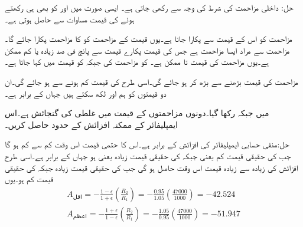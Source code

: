 حل:
داخلی مزاحمت  کی شرط کی وجہ سے  رکھی جاتی ہے۔ ایسی صورت میں  اور  کو بھی  ہی رکھتے ہوئے  کی قیمت مساوات   سے حاصل ہوتی ہے۔  

مزاحمت کو اس کے قیمت سے پکارا جاتا ہے۔یوں  قیمت کے مزاحمت کو  کا مزاحمت پکارا جائے گا۔ مزاحمت سے مراد ایسا مزاحمت ہے جس کی قیمت پکارے قیمت سے  پانچ فی صد زیادہ یا کم ممکن ہے۔یوں 
 مزاحمت کی قیمت  تا  ممکن ہے۔ کو مزاحمت کی  جبکہ   کو قیمت میں  کہا جاتا ہے۔

مزاحمت  کی قیمت  بڑھنے سے  بڑھ کر  ہو جائے گی۔اسی طرح  کی قیمت  کم ہونے سے   ہو جائے گی۔ان دو قیمتوں کو ہم  اور  لکھ سکتے ہیں جہاں  کے برابر ہے۔

 میں  جبکہ  رکھا گیا۔دونوں مزاحمتوں کے قیمت میں  غلطی کی گنجائش ہے۔اس ایمپلیفائر کے ممکنہ افزائش کے حدود حاصل کریں۔

حل:منفی حسابی ایمپلیفائر کی افزائش  کے برابر ہے۔اس کا حتمی قیمت اس وقت کم سے کم  ہو گا جب  کی حقیقی قیمت  کم یعنی  جبکہ  کی حقیقی قیمت  زیادہ  یعنی  ہو جہاں  کے برابر ہے۔اسی طرح افزائش کی زیادہ سے زیادہ قیمت اس وقت حاصل ہو گی جب  کی حقیقی قیمت  زیادہ جبکہ  کی حقیقی قیمت  کم ہو۔یوں
\begin{align*}
A_{\text{اقل}}=-\frac{1-\epsilon}{1+\epsilon} \left(\frac{R_2}{R_1} \right)=-\frac{0.95}{1.05} \left(\frac{47000}{1000}\right)=-42.524\\
A_{\text{اعظم}}=-\frac{1+\epsilon}{1-\epsilon} \left(\frac{R_2}{R_1} \right)=-\frac{1.05}{0.95} \left(\frac{47000}{1000}\right)=-51.947
\end{align*}

